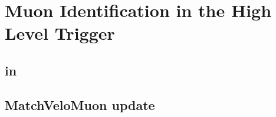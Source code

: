 
\chapter{Muon Identification in the \lhcb High Level Trigger}
\label{Muon_id_hlt}


\section{\muonID in \hltone}
% 

\section{MatchVeloMuon update}
